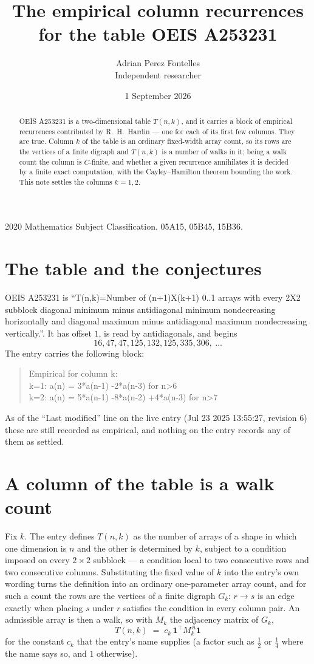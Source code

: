 \documentclass[11pt,a4paper]{article}
\title{The empirical column recurrences for the table OEIS A253231}
\author{Adrian Perez Fontelles\\ \small Independent researcher}
\date{1 September 2026}
\theoremstyle{plain}
\theoremstyle{definition}
\begin{document}
\maketitle

\begin{abstract}
OEIS A253231 is a two-dimensional table $T(n,k)$, and it carries a block of empirical
recurrences contributed by R.~H.~Hardin --- one for each of its first few columns. They are
true. Column $k$ of the table is an ordinary fixed-width array count, so its rows are the
vertices of a finite digraph and $T(n,k)$ is a number of walks in it; being a walk count the
column is $C$-finite, and whether a given recurrence annihilates it is decided by a finite
exact computation, with the Cayley--Hamilton theorem bounding the work. This note settles the columns $k=1, 2$.
\end{abstract}

\noindent\small 2020 Mathematics Subject Classification. 05A15, 05B45, 15B36.\normalsize

\section{The table and the conjectures}

OEIS A253231 is ``T(n,k)=Number of (n+1)X(k+1) 0..1 arrays with every 2X2 subblock diagonal minimum minus antidiagonal minimum nondecreasing horizontally and diagonal maximum minus antidiagonal maximum nondecreasing vertically.''. It has offset $1$, is
read by antidiagonals, and begins
\[
16, 47, 47, 125, 132, 125, 335, 306,\ \dots
\]
The entry carries the following block:
\begin{quote}\small
Empirical for column k:\\
k=1: a(n) = 3*a(n-1) -2*a(n-3) for n>6\\
k=2: a(n) = 5*a(n-1) -8*a(n-2) +4*a(n-3) for n>7\\
\end{quote}
As of the ``Last modified'' line on the live entry (Jul 23 2025 13:55:27, revision 6) these are still
recorded as empirical, and nothing on the entry records any of them as settled.

\section{A column of the table is a walk count}

Fix $k$. The entry defines $T(n,k)$ as the number of arrays of a shape in which one dimension
is $n$ and the other is determined by $k$, subject to a condition imposed on every
$2\times2$ subblock --- a condition local to two consecutive rows and two consecutive columns.
Substituting the fixed value of $k$ into the entry's own wording turns the definition into an
ordinary one-parameter array count, and for such a count the rows are the vertices of a finite
digraph $G_k$: $r\to s$ is an edge exactly when placing $s$ under $r$ satisfies the condition
in every column pair. An admissible array is then a walk, so with $M_k$ the adjacency matrix
of $G_k$,
\[
T(n,k)\;=\;c_k\,\mathbf{1}^{\!\top}M_k^{\,n}\mathbf{1}
\]
for the constant $c_k$ that the entry's name supplies (a factor such as $\tfrac12$ or
$\tfrac14$ where the name says so, and $1$ otherwise).
\end{document}
